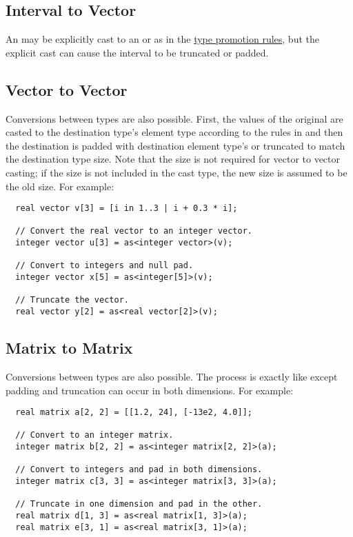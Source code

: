 \documentclass[../gazprea.tex]{subfiles}
\begin{document}
\subsection{Interval to Vector}
\label{ssec:typeCasting_itov}
An   may be explicitly cast to an  or 
 as in the \hyperref[ssec:typePromotion_ivltov]{type promotion rules}, but the explicit
cast can cause the interval to be truncated or  padded.

\subsection{Vector to Vector}
\label{ssec:typeCasting_vtov}
Conversions between  types are also possible. First, the values of the original are
casted to the destination type's element type according to the rules in
 and then the destination is padded with destination element type's
 or truncated to match the destination type size. Note that the size is not required for
vector to vector casting; if the size is not included in the cast type, the new size is assumed to
be the old size. For example:
\begin{lstlisting}
  real vector v[3] = [i in 1..3 | i + 0.3 * i];

  // Convert the real vector to an integer vector.
  integer vector u[3] = as<integer vector>(v);

  // Convert to integers and null pad.
  integer vector x[5] = as<integer[5]>(v);

  // Truncate the vector.
  real vector y[2] = as<real vector[2]>(v);
\end{lstlisting}

\subsection{Matrix to Matrix}
\label{ssec:typeCasting_mtom}
Conversions between  types are also possible. The process is exactly like
 except padding and truncation can occur in both dimensions. For
example:
\begin{lstlisting}
  real matrix a[2, 2] = [[1.2, 24], [-13e2, 4.0]];

  // Convert to an integer matrix.
  integer matrix b[2, 2] = as<integer matrix[2, 2]>(a);

  // Convert to integers and pad in both dimensions.
  integer matrix c[3, 3] = as<integer matrix[3, 3]>(a);

  // Truncate in one dimension and pad in the other.
  real matrix d[1, 3] = as<real matrix[1, 3]>(a);
  real matrix e[3, 1] = as<real matrix[3, 1]>(a);
\end{lstlisting}
\end{document}
